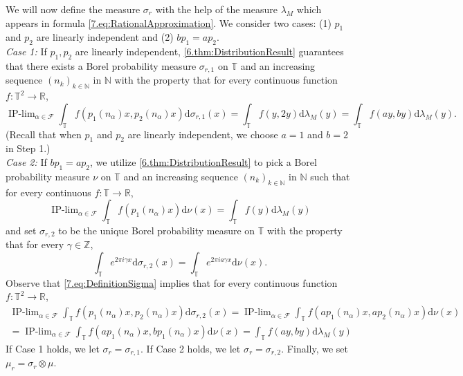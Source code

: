 \documentclass[11pt,american,preprint]{elsarticle}
\numberwithin{equation}{section}
\theoremstyle{plain}
\theoremstyle{plain*}
\theoremstyle{plain}
\theoremstyle{plain*}
\theoremstyle{plain}
\theoremstyle{plain*}
\theoremstyle{remark}
\theoremstyle{remark*}
\theoremstyle{remark}
\theoremstyle{remark*}
\theoremstyle{remark}
\theoremstyle{remark*}
\theoremstyle{plain}
\theoremstyle{definition}
\theoremstyle{plain}
\theoremstyle{plain} %
\newcommand{\R}{\mathbb{R}}
\newcommand{\N}{\mathbb{N}}
\newcommand{\Z}{\mathbb{Z}}
\begin{document}
We will now define the measure $\sigma_r$ with the help of the measure  $\lambda_M$ which appears in formula \eqref{7.eq:RationalApproximation}. We consider two cases: (1)  $p_1$ and $p_2$ are linearly independent and (2)  $bp_1=ap_2$.\\
\textit{ Case 1: } If $p_1,p_2$ are linearly independent,  \cref{6.thm:DistributionResult} guarantees that there exists a Borel probability measure  $\sigma_{r,1}$ on $\mathbb T$ and an increasing sequence  $(n_k)_{k\in\N}$ in $\N$ with the property that for every continuous function $f:\mathbb T^2\rightarrow \R$, 
\begin{equation*}
\mathop{\text{IP-lim}}_{\alpha\in\mathcal F}\int_\mathbb T f(p_1(n_\alpha)x,p_2(n_\alpha)x)\text{d}\sigma_{r,1}(x)=\int_{\mathbb T} f(y,2y)\text{d}\lambda_{M}(y)
=\int_{\mathbb T} f(ay,by)\text{d}\lambda_{M}(y).
\end{equation*}
(Recall that when $p_1$ and $p_2$ are linearly independent, we choose $a=1$ and $b=2$ in Step 1.)\\
\textit{ Case 2:} If $bp_1=ap_2$, we utilize \cref{6.thm:DistributionResult} to pick a Borel probability measure $\nu$ on $\mathbb T$ and an increasing sequence $(n_k)_{k\in\N}$ in $\N$  such that for every continuous $f:\mathbb T\rightarrow \R$,
$$
\mathop{\text{IP-lim}}_{\alpha\in\mathcal F}\int_\mathbb T f(p_1(n_\alpha)x)\text{d}\nu(x)=\int_{\mathbb T} f(y)\text{d}\lambda_{M}(y)
$$
 and  set $\sigma_{r,2}$ to be the unique Borel probability measure on $\mathbb T$ with the property that for every $\gamma\in\Z$,
\begin{equation}\label{7.eq:DefinitionSigma}
\int_\mathbb T e^{2\pi i \gamma x}\text{d}\sigma_{r,2}(x)=\int_\mathbb T e^{2\pi i a\gamma x}\text{d}\nu(x).
\end{equation}
Observe that \eqref{7.eq:DefinitionSigma} implies that for every continuous function $f:\mathbb T^2\rightarrow \R$, 
\begin{multline*}
\mathop{\text{IP-lim}}_{\alpha\in\mathcal F}\int_\mathbb T f(p_1(n_\alpha)x,p_2(n_\alpha)x)\text{d}\sigma_{r,2}(x)=\mathop{\text{IP-lim}}_{\alpha\in\mathcal F}\int_\mathbb T f(ap_1(n_\alpha)x,ap_2(n_\alpha)x)\text{d}\nu(x)\\
=\mathop{\text{IP-lim}}_{\alpha\in\mathcal F}\int_\mathbb T f(ap_1(n_\alpha)x,bp_1(n_\alpha)x)\text{d}\nu(x)=\int_{\mathbb T} f(ay,by)\text{d}\lambda_{M}(y)
\end{multline*}
If Case 1 holds, we  let $\sigma_r=\sigma_{r,1}$. If Case 2 holds, we  let $\sigma_r=\sigma_{r,2}$. Finally, we set $\mu_r=\sigma_r\otimes\mu$.\\
\end{document}
